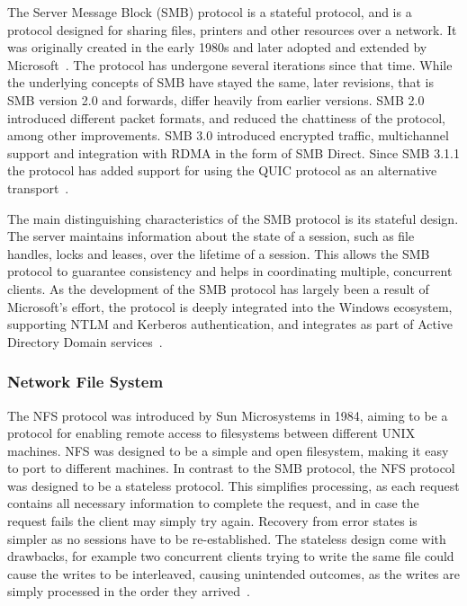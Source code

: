 \documentclass[english, 12pt, a4paper, elec, utf8, a-2b, online]{aaltothesis}
\begin{document}
The Server Message Block (SMB) protocol is a stateful protocol, and is a protocol designed for
sharing files, printers and other resources over a network. It was originally created
in the early 1980s and later adopted and extended by Microsoft~\cite{samba_myths}.
The protocol has undergone several iterations since that time. While the underlying
concepts of SMB have stayed the same, later revisions, that is SMB version 2.0 and forwards,
differ heavily from earlier versions. SMB 2.0 introduced different packet formats, and reduced
the chattiness of the protocol, among other improvements. SMB 3.0 introduced encrypted traffic,
multichannel support and integration with RDMA in the form of SMB Direct. Since SMB 3.1.1 the
protocol has added support for using the QUIC protocol as an alternative transport~\cite{smb2}.

The main distinguishing characteristics of the SMB protocol is its stateful design.
The server maintains information about the state of a session, such as file handles,
locks and leases, over the lifetime of a session. This allows the SMB protocol to
guarantee consistency and helps in coordinating multiple, concurrent clients. As 
the development of the SMB protocol has largely been a result of Microsoft's effort,
the protocol is deeply integrated into the Windows ecosystem,
supporting NTLM and Kerberos authentication, and integrates as part of Active Directory Domain
services~\cite{smb2}.

\subsubsection{Network File System}

The NFS protocol was introduced by Sun Microsystems in 1984, aiming to be a protocol
for enabling remote access to filesystems between different UNIX machines. NFS was
designed to be a simple and open filesystem, making it easy to port to different
machines. In contrast to the SMB protocol, the NFS protocol was designed to be a 
stateless protocol. This simplifies processing, as each request contains all necessary
information to complete the request, and in case the request fails the client may
simply try again. Recovery from error states is simpler as no sessions have to be
re-established. The stateless  design come with drawbacks,
for example two concurrent clients trying to write the same file could cause the
writes to be interleaved, causing unintended outcomes, as the writes are simply
processed in the order they arrived~\cite{nfs_design}.
\end{document}
